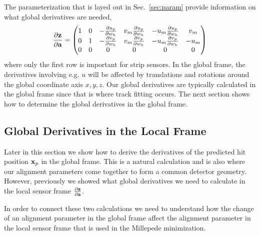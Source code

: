 \documentclass{article}
\def\vec#1{\ensuremath{\mathrm{\bf #1}}}
\def\partder#1#2{\ensuremath{\frac{\partial #1}{\partial #2}}}
\begin{document}
The parameterization that is layed out in Sec.~\ref{sec:param} provide information on what 
global derivatives are needed,
\[
\partder{\vec{z}}{\vec{a}} = 
\begin{pmatrix}
1 & 0 & -\partder{u_p}{w_h} & v_m \partder{u_p}{w_h} & -u_m \partder{u_p}{w_h} & v_m \\
0 & 1 & - \partder{v_p}{w_h} & v_m \partder{v_p}{w_h} & -u_m \partder{v_p}{w_h} & -u_m \\
0 & 0 & 0 & 0 & 0 & 0
\end{pmatrix}
\]
where only the first row is important for strip sensors. In the global frame, the derivatives involving 
e.g. $u$ will be affected by translations and rotations around the global coordinate axis $x,y,z$. 
Our global derivatives are typically calculated in the global frame since that is where track fitting occurs. The next section shows how to determine the global derivatives in the global frame.

\subsection{Global Derivatives in the Local Frame}

Later in this section we show how to derive the derivatives of the predicted hit position $\vec{x}_p$ 
in the global frame. This is a natural calculation and is also where our alignment parameters 
come together to form a common detector geometry. However, previously we showed what global derivatives we need to calculate in the local sensor frame $\partder{\vec{z}}{\vec{a}}$. 

In order to connect 
these two calculations we need to understand how the change of an alignment parameter in the 
global frame affect the alignment parameter in the local sensor frame that is used in the Millepede minimization. 
\end{document}
